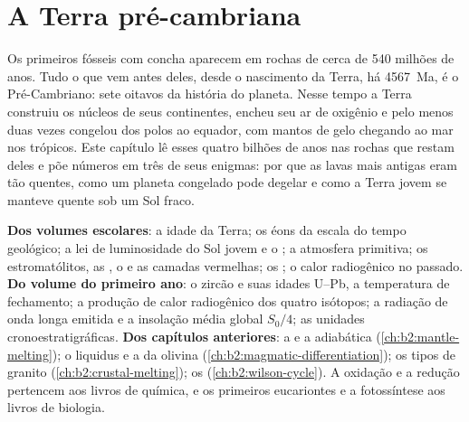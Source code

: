 \chapter{A Terra pré-cambriana}\label{ch:b2:precambrian-earth}

Os primeiros fósseis com concha aparecem em rochas de cerca de 540 milhões de anos. Tudo o que vem antes deles, desde
o nascimento da Terra, há \qty{4567}{Ma}, é o Pré-Cambriano: sete oitavos da história do
planeta. Nesse tempo a Terra construiu os núcleos de seus continentes, encheu seu ar de oxigênio
e pelo menos duas vezes congelou dos polos ao equador, com mantos de gelo chegando ao mar
nos trópicos. Este capítulo lê esses quatro bilhões de anos nas rochas que restam deles
e põe números em três de seus enigmas: por que as lavas mais antigas eram tão quentes, como um
planeta congelado pode degelar e como a Terra jovem se manteve quente sob um Sol fraco.

\begin{recall}
\textbf{Dos volumes escolares}: a idade da Terra; os éons da escala do tempo geológico;
a lei de luminosidade do Sol jovem e o ; a atmosfera primitiva;
os estromatólitos, as , o  e as camadas vermelhas; os ;
o calor radiogênico no passado. \textbf{Do volume do primeiro ano}: o zircão e suas idades U--Pb,
a temperatura de fechamento; a produção de calor radiogênico dos quatro isótopos; a radiação de onda
longa emitida e a insolação média global $S_0/4$; as unidades cronoestratigráficas.
\textbf{Dos capítulos anteriores}: a  e a adiabática
(\cref{ch:b2:mantle-melting}); o liquidus e a  da olivina
(\cref{ch:b2:magmatic-differentiation}); os tipos de granito (\cref{ch:b2:crustal-melting});
os  (\cref{ch:b2:wilson-cycle}). A oxidação e a redução pertencem aos livros
de química, e os primeiros eucariontes e a fotossíntese aos livros de biologia.
\end{recall}

